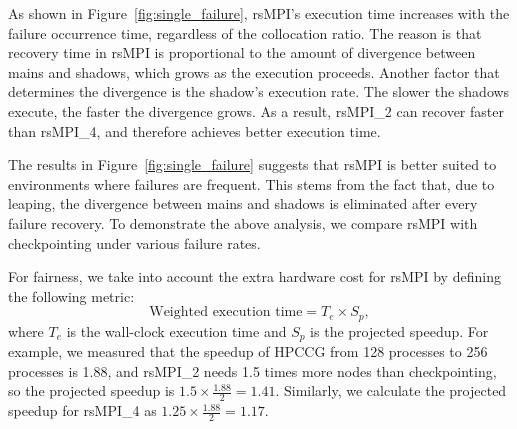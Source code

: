 As shown in Figure~\ref{fig:single_failure}, rsMPI's execution time increases with the failure occurrence time, regardless of the collocation ratio. The reason is that recovery time in rsMPI is proportional to the amount of divergence between mains and shadows, which grows as the execution proceeds. 
Another factor that determines the divergence is the shadow's execution rate. The slower the shadows execute, the faster the divergence grows. As a result, rsMPI\_2 can recover faster than rsMPI\_4, and therefore achieves better execution time.


The results in Figure~\ref{fig:single_failure} suggests that rsMPI is better suited to environments where failures are frequent. 
This stems from the fact that, due to leaping, the divergence between mains and shadows is eliminated after every failure recovery. %
To demonstrate the above analysis, we compare rsMPI with checkpointing under various failure rates. 

For fairness, we take into account the extra hardware cost for rsMPI by defining the following metric:
$$\text{Weighted execution time} = T_e \times S_p,$$ where $T_e$ is the wall-clock execution time and $S_p$ is the projected speedup. For example, we measured that the speedup of HPCCG from 128 processes to 256 processes is 1.88, and rsMPI\_2 needs 1.5 times more nodes than checkpointing, so the projected speedup is $1.5\times\frac{1.88}{2}=1.41$. Similarly, we calculate the projected speedup for rsMPI\_4 as $1.25\times\frac{1.88}{2}=1.17$.

